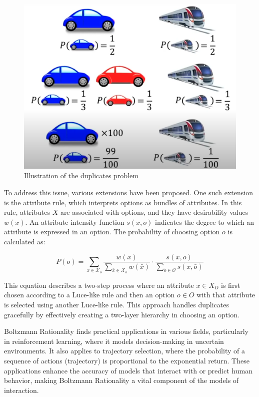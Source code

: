 \documentclass[
  letterpaper,
  DIV=11,
  numbers=noendperiod,
  oneside]{scrreprt}
\theoremstyle{remark}
\begin{document}
\begin{figure}[H]

{\centering \includegraphics{Figures/car.png}

}

\caption{Illustration of the duplicates problem}

\end{figure}%

To address this issue, various extensions have been proposed. One such
extension is the attribute rule, which interprets options as bundles of
attributes. In this rule, attributes \(X\) are associated with options,
and they have desirability values \(w(x)\). An attribute intensity
function \(s(x, o)\) indicates the degree to which an attribute is
expressed in an option. The probability of choosing option \(o\) is
calculated as:

\[P(o) = \sum_{x \in \mathcal{X}_o} \frac{w(x)}{\sum_{\bar{x} \in \mathcal{X}_o} w(\bar{x})} \cdot \frac{s(x, o)}{\sum_{\tilde{o} \in \mathcal{O}} s(x, \bar{o})}\]

This equation describes a two-step process where an attribute
\(x \in X_O\) is first chosen according to a Luce-like rule and then an
option \(o \in O\) with that attribute is selected using another
Luce-like rule. This approach handles duplicates gracefully by
effectively creating a two-layer hierarchy in choosing an option.

Boltzmann Rationality finds practical applications in various fields,
particularly in reinforcement learning, where it models decision-making
in uncertain environments. It also applies to trajectory selection,
where the probability of a sequence of actions (trajectory) is
proportional to the exponential return. These applications enhance the
accuracy of models that interact with or predict human behavior, making
Boltzmann Rationality a vital component of the models of interaction.
\end{document}
